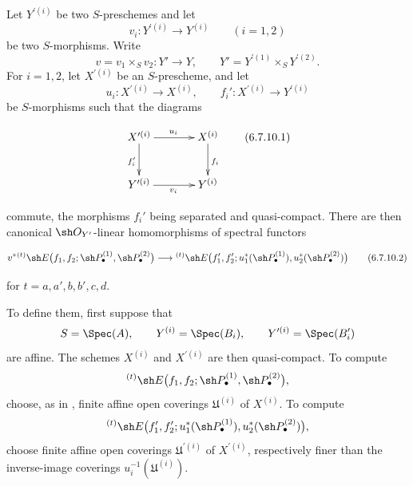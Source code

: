 \begin{env}[6.7.10]
\label{III.6.7.10}
Let $Y^{\prime(i)}$ be two $S$-preschemes and let
\[
  v_i:Y^{\prime(i)}\longrightarrow Y^{(i)}
  \qquad (i=1,2)
\]
be two $S$-morphisms.  Write
\[
  v=v_1\times_Sv_2:Y'\longrightarrow Y,
  \qquad
  Y'=Y^{\prime(1)}\times_SY^{\prime(2)}.
\]
For $i=1,2$, let $X^{\prime(i)}$ be an $S$-prescheme, and let
\[
  u_i:X^{\prime(i)}\longrightarrow X^{(i)},
  \qquad
  f_i':X^{\prime(i)}\longrightarrow Y^{\prime(i)}
\]
be $S$-morphisms such that the diagrams
\begin{env}[6.7.10.1]
\label{III.6.7.10.1}
\[
\xymatrix@C=36pt@R=28pt{
  X^{\prime(i)} \ar[r]^{u_i}\ar[d]_{f_i'}
  & X^{(i)}\ar[d]^{f_i}
  \\
  Y^{\prime(i)} \ar[r]_{v_i}
  & Y^{(i)}
}
\tag{6.7.10.1}\label{III.6.7.10.1.eq}
\]
\end{env}
commute, the morphisms $f_i'$ being separated and quasi-compact.
There are then canonical $\sh O_{Y'}$-linear homomorphisms of
spectral functors
\begin{env}[6.7.10.2]
\label{III.6.7.10.2}
\[
  v^*
  {}^{(t)}\sh E
  \bigl(
    f_1,f_2;
    \sh P_\bullet^{(1)},\sh P_\bullet^{(2)}
  \bigr)
  \longrightarrow
  {}^{(t)}\sh E
  \bigl(
    f_1',f_2';
    u_1^*(\sh P_\bullet^{(1)}),
    u_2^*(\sh P_\bullet^{(2)})
  \bigr)
  \tag{6.7.10.2}\label{III.6.7.10.2.eq}
\]
\end{env}
for $t=a,a',b,b',c,d$.

To define them, first suppose that
\[
  S=\Spec(A),\qquad
  Y^{(i)}=\Spec(B_i),\qquad
  Y^{\prime(i)}=\Spec(B_i')
\]
are affine.  The schemes $X^{(i)}$ and $X^{\prime(i)}$ are then
quasi-compact.  To compute
\[
  {}^{(t)}\sh E
  \bigl(
    f_1,f_2;
    \sh P_\bullet^{(1)},\sh P_\bullet^{(2)}
  \bigr),
\]
choose, as in , finite affine open coverings
$\mathfrak U^{(i)}$ of $X^{(i)}$.  To compute
\[
  {}^{(t)}\sh E
  \bigl(
    f_1',f_2';
    u_1^*(\sh P_\bullet^{(1)}),
    u_2^*(\sh P_\bullet^{(2)})
  \bigr),
\]
choose finite affine open coverings $\mathfrak U^{\prime(i)}$ of
$X^{\prime(i)}$, respectively finer than the inverse-image
coverings $u_i^{-1}(\mathfrak U^{(i)})$.



\end{env}
